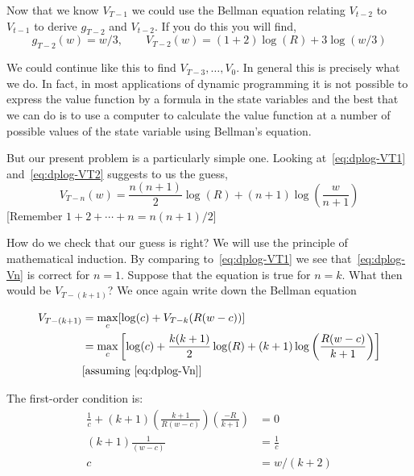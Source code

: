 \documentclass[12pt,reqno]{amsart}
\begin{document}
Now that we know $V_{T-1}$ we could use the Bellman equation relating
$V_{t-2}$ to $V_{t-1}$ to derive $g_{T-2}$ and $V_{t-2}$. If you do
this you will find,
\begin{equation}\label{eq:dplog-VT2}
g_{T-2}(w) = w/3,\qquad V_{T-2}(w)=(1+2)\log(R)+3\log(w/3)
\end{equation}

We could continue like this to find $V_{T-3},\ldots,V_0$. In general
this is precisely what we do. In fact, in most applications of dynamic
programming  it is not possible to express the value function
by a formula in the state variables and the best that we can do is to
use a computer to calculate the value function at a number of possible
values of the state variable using Bellman's equation.

But our present problem is a particularly simple one. Looking
at~\eqref{eq:dplog-VT1} and~\eqref{eq:dplog-VT2} suggests to us the
guess,
\begin{equation}\label{eq:dplog-Vn}
V_{T-n}(w)=\frac{n(n+1)}{2}\log(R)+(n+1)\log\left(\frac{w}{n+1}\right)
\end{equation}
[Remember $1+2+\cdots+n=n(n+1)/2$]

How do we check that our guess is right? We will use the principle of
mathematical induction. By comparing to~\eqref{eq:dplog-VT1} we see
that~\eqref{eq:dplog-Vn} is correct for $n=1$. Suppose that the
equation is true for $n=k$. What then would be $V_{T-(k+1)}$? We once
again write down the Bellman equation

\begin{equation}\label{eq:dplog-optim-induct}
\begin{split}
V_{T-(k+1)}&=\max_c [\log(c)+V_{T-k}(R(w-c))]\\
&=\max_c \left[\log(c)  +
\frac{k(k+1)}{2}\log(R)+(k+1)\log\left(\frac{R(w-c)}{k+1}\right)\right]\\
&
\text{[assuming~\eqref{eq:dplog-Vn}]}
\end{split}
\end{equation}

The first-order condition is:
\begin{equation}\label{eq:dplog-policy}
\begin{split}
  \frac{1}{c} 
  +
  (k+1)\left(\frac{k+1}{R(w-c)}\right)\left(\frac{-R}{k+1}\right)&=0\\
  (k+1)\frac{1}{(w-c)}&=\frac{1}{c}\\
  c&=w/(k+2)
\end{split}
\end{equation}
\end{document}
